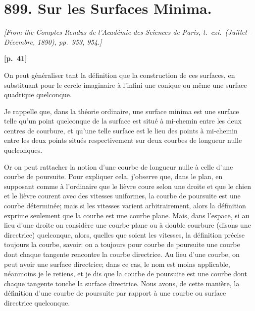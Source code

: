 \documentclass[11pt,a4paper]{article}
\theoremstyle{plain}
\begin{document}
\newpage

\section*{899. Sur les Surfaces Minima.}

\noindent\textit{[From the Comptes Rendus de l'Acad\'emie des Sciences de Paris, t.\ cxi.\ (Juillet--D\'ecembre, 1890), pp.\ 953, 954.]}

\vspace{0.5em}
\noindent\textbf{[p.\ 41]}

On peut g\'en\'eraliser tant la d\'efinition que la construction de ces surfaces, en substituant pour le cercle imaginaire \`a l'infini une conique ou m\^eme une surface quadrique quelconque.

Je rappelle que, dans la th\'eorie ordinaire, une surface minima est une surface telle qu'un point quelconque de la surface est situ\'e \`a mi-chemin entre les deux centres de courbure, et qu'une telle surface est le lieu des points \`a mi-chemin entre les deux points situ\'es respectivement sur deux courbes de longueur nulle quelconques.

Or on peut rattacher la notion d'une courbe de longueur nulle \`a celle d'une courbe de poursuite. Pour expliquer cela, j'observe que, dans le plan, en supposant comme \`a l'ordinaire que le li\`evre coure selon une droite et que le chien et le li\`evre courent avec des vitesses uniformes, la courbe de poursuite est une courbe d\'etermin\'ee; mais si les vitesses varient arbitrairement, alors la d\'efinition exprime seulement que la courbe est une courbe plane. Mais, dans l'espace, si au lieu d'une droite on consid\`ere une courbe plane ou \`a double courbure (disons une directrice) quelconque, alors, quelles que soient les vitesses, la d\'efinition pr\'ecise toujours la courbe, savoir: on a toujours pour courbe de poursuite une courbe dont chaque tangente rencontre la courbe directrice. Au lieu d'une courbe, on peut avoir une surface directrice; dans ce cas, le nom est moins applicable, n\'eanmoins je le retiens, et je dis que la courbe de poursuite est une courbe dont chaque tangente touche la surface directrice. Nous avons, de cette mani\`ere, la d\'efinition d'une courbe de poursuite par rapport \`a une courbe ou surface directrice quelconque.
\end{document}
